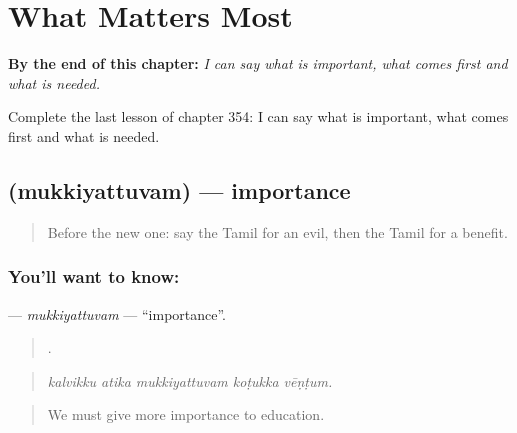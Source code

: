
\chapter{What Matters Most}
\label{ch:ta-what-matters-most}

\begin{chapteropening}
\textbf{By the end of this chapter:} \emph{I can say what is important, what comes first and what is needed.}

Complete the last lesson of chapter 354: I can say what is important, what comes first and what is needed.
\end{chapteropening}

\section[\texorpdfstring{\ta{முக்கியத்துவம்} (mukkiyattuvam)}{முக்கியத்துவம் (mukkiyattuvam)}]{ (mukkiyattuvam) — importance}

\label{lesson:TA-C354-mukkiyattuvam}



\begin{quote}
Before the new one: say the Tamil for an evil, then the Tamil for a benefit.
\end{quote}

\subsection*{You'll want to know: }
\textbf{} — \emph{mukkiyattuvam} — \textquotedblleft{}importance\textquotedblright{}.

\begin{quote}
    .
\end{quote}

\begin{quote}
\emph{kalvikku atika mukkiyattuvam koṭukka vēṇṭum.}
\end{quote}

\begin{quote}
We must give more importance to education.
\end{quote}

